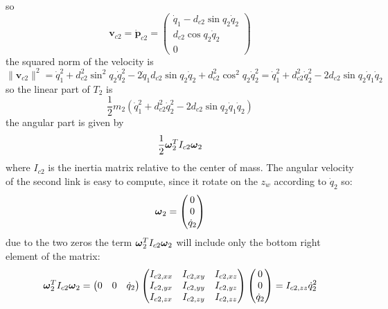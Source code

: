 \documentclass[10pt, a4paper]{report}
\begin{document}
so\begin{equation}
    \mathbf v_{c2}=\dot{\mathbf p}_{c2}=\begin{pmatrix}
        \dot q_1-d_{c2}\sin q_2\dot q_2\\ 
         d_{c2}\cos q_2\dot q_2\\ 0
    \end{pmatrix}
\end{equation}
the squared norm of the velocity is\begin{equation}
    \| \mathbf v_{c2}\|^2=\dot q_1^2+d_{c2}^2\sin^2 q_2\dot q_2^2-2\dot q_1d_{c2}\sin q_2\dot q_2+d^2_{c2}\cos^2 q_2\dot q^2_2=\dot q_1^2+d_{c2}^2\dot q_2^2-2d_{c2}\sin q_2\dot q_1\dot q_2
\end{equation}
so the linear part of $T_2$ is\begin{equation}
    \frac{1}{2}m_2(\dot q_1^2+d_{c2}^2\dot q_2^2-2d_{c2}\sin q_2\dot q_1\dot q_2)
\end{equation}
the angular part is given by\begin{equation}
    \frac{1}{2}{\boldsymbol{\omega}}^T_2 I_{c2}{\boldsymbol{\omega}}_2
\end{equation}
where $I_{c2}$ is the inertia matrix relative to the center of mass. The angular velocity of the second link is easy to compute, since it rotate on the $z_w$ according to $\dot q_2$ so:\begin{equation}
    {\boldsymbol{\omega}}_2=\begin{pmatrix}
        0\\0\\ \dot q_2
    \end{pmatrix}
\end{equation}
due to the two zeros the term ${\boldsymbol{\omega}}^T_2 I_{c2}{\boldsymbol{\omega}}_2$ will include only the bottom right element of the matrix:\begin{equation}
    {\boldsymbol{\omega}}^T_2 I_{c2}{\boldsymbol{\omega}}_2=
    \begin{pmatrix}
        0&0& \dot q_2
    \end{pmatrix}
\begin{pmatrix}
       I_{c2,xx}&I_{c2,xy}&I_{c2,xz}\\
       I_{c2,yx}&I_{c2,yy}&I_{c2,yz}\\
       I_{c2,zx}&I_{c2,zy}&I_{c2,zz}\\
    \end{pmatrix}
    \begin{pmatrix}
        0\\0\\ \dot q_2
    \end{pmatrix}=I_{c2,zz}\dot q_2^2
\end{equation}
\end{document}
